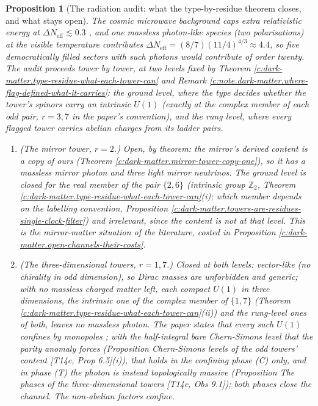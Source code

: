 \documentclass[11pt]{article}
\newtheorem{proposition}[theorem]{Proposition}
\theoremstyle{definition}
\theoremstyle{plain}
\newcommand{\changedmark}[2]{\marginpar{\raggedright\scriptsize\color{#1}#2}}
\providecommand{\Neff}{}\renewcommand{\Neff}{N_{\mathrm{eff}}}
\begin{document}
\begin{proposition}[The radiation audit: what the type-by-residue theorem closes, and what stays open]\label{c:dark-matter.radiation-audit-what-theorem-closes-what}
\changedmark{BurntOrange}{changed since the deposit}
The cosmic microwave background caps extra relativistic energy at $\Delta\Neff \lesssim 0.3$ \cite{Planck2018}, and one massless photon-like species (two polarisations) at the visible temperature contributes $\Delta\Neff = (8/7)(11/4)^{4/3} \approx 4.4$, so five democratically filled sectors with such photons would contribute of order twenty. The audit proceeds tower by tower, at two levels fixed by Theorem \ref{c:dark-matter.type-residue-what-each-tower-can} and Remark \ref{c:note.dark-matter.where-flag-defined-what-it-carries}: the \emph{ground} level, where the type decides whether the tower's spinors carry an intrinsic $U(1)$ (exactly at the complex member of each odd pair, $r = 3, 7$ in the paper's convention), and the \emph{rung} level, where every flagged tower carries abelian charges from its ladder pairs.
\begin{enumerate}
\item \emph{(The mirror tower, $r = 2$.)} Open, by theorem: the mirror's derived content is a copy of ours (Theorem \ref{c:dark-matter.mirror-tower-copy-one}), so it has a massless mirror photon and three light mirror neutrinos. The ground level is closed for the real member of the pair $\{2, 6\}$ (intrinsic group $\mathbb{Z}_{2}$, Theorem \ref{c:dark-matter.type-residue-what-each-tower-can}(i); which member depends on the labelling convention, Proposition \ref{c:dark-matter.towers-are-residues-single-clock-filter}) and irrelevant, since the content is not at that level. This is the mirror-matter situation of the literature, costed in Proposition \ref{c:dark-matter.open-channels-their-costs}.
\item \emph{(The three-dimensional towers, $r = 1, 7$.)} Closed at both levels: vector-like (no chirality in odd dimension), so Dirac masses are unforbidden and generic; with no massless charged matter left, each compact $U(1)$ in three dimensions, the intrinsic one of the complex member of $\{1, 7\}$ (Theorem \ref{c:dark-matter.type-residue-what-each-tower-can}(ii)) and the rung-level ones of both, leaves no massless photon. The paper states that every such $U(1)$ confines by monopoles \cite{Polyakov1977}; with the half-integral bare Chern-Simons level that the parity anomaly forces (Proposition \emph{Chern-Simons levels of the odd towers' content} [T14c, Prop 6.5](i)), that holds in the confining phase (C) only, and in phase (T) the photon is instead topologically massive (Proposition \emph{The phases of the three-dimensional towers} [T14c, Obs 9.1]); both phases close the channel. The non-abelian factors confine.

\end{enumerate}
\end{proposition}
\end{document}
